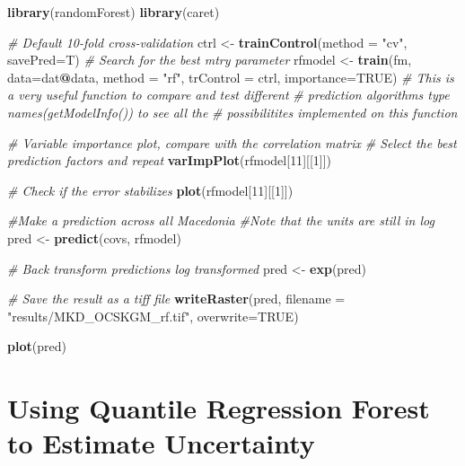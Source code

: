 \documentclass[10pt,b5paper,]{book}
\newenvironment{Shaded}{\begin{snugshade}}{\end{snugshade}}
\newcommand{\CommentTok}[1]{\textcolor[rgb]{0.56,0.35,0.01}{\textit{#1}}}
\newcommand{\DataTypeTok}[1]{\textcolor[rgb]{0.13,0.29,0.53}{#1}}
\newcommand{\DecValTok}[1]{\textcolor[rgb]{0.00,0.00,0.81}{#1}}
\newcommand{\KeywordTok}[1]{\textcolor[rgb]{0.13,0.29,0.53}{\textbf{#1}}}
\newcommand{\NormalTok}[1]{#1}
\newcommand{\OperatorTok}[1]{\textcolor[rgb]{0.81,0.36,0.00}{\textbf{#1}}}
\newcommand{\OtherTok}[1]{\textcolor[rgb]{0.56,0.35,0.01}{#1}}
\newcommand{\StringTok}[1]{\textcolor[rgb]{0.31,0.60,0.02}{#1}}
\theoremstyle{definition}
\theoremstyle{definition}
\theoremstyle{definition}
\theoremstyle{remark}
\begin{document}
\begin{Shaded}
\begin{Highlighting}[]
\KeywordTok{library}\NormalTok{(randomForest)}
\KeywordTok{library}\NormalTok{(caret)}

\CommentTok{# Default 10-fold cross-validation}
\NormalTok{ctrl <-}\StringTok{ }\KeywordTok{trainControl}\NormalTok{(}\DataTypeTok{method =} \StringTok{"cv"}\NormalTok{, }\DataTypeTok{savePred=}\NormalTok{T)}
\CommentTok{# Search for the best mtry parameter}
\NormalTok{rfmodel <-}\StringTok{ }\KeywordTok{train}\NormalTok{(fm, }\DataTypeTok{data=}\NormalTok{dat}\OperatorTok{@}\NormalTok{data, }\DataTypeTok{method =} \StringTok{"rf"}\NormalTok{, }\DataTypeTok{trControl =}\NormalTok{ ctrl,}
                 \DataTypeTok{importance=}\OtherTok{TRUE}\NormalTok{)}
\CommentTok{# This is a very useful function to compare and test different}
\CommentTok{# prediction algorithms type names(getModelInfo()) to see all the}
\CommentTok{# possibilitites implemented on this function}


\CommentTok{# Variable importance plot, compare with the correlation matrix}
\CommentTok{# Select the best prediction factors and repeat}
\KeywordTok{varImpPlot}\NormalTok{(rfmodel[}\DecValTok{11}\NormalTok{][[}\DecValTok{1}\NormalTok{]])}

\CommentTok{# Check if the error stabilizes}
\KeywordTok{plot}\NormalTok{(rfmodel[}\DecValTok{11}\NormalTok{][[}\DecValTok{1}\NormalTok{]])}

\CommentTok{#Make a prediction across all Macedonia}
\CommentTok{#Note that the units are still in log}
\NormalTok{pred <-}\StringTok{ }\KeywordTok{predict}\NormalTok{(covs, rfmodel)}

\CommentTok{# Back transform predictions log transformed}
\NormalTok{pred <-}\StringTok{ }\KeywordTok{exp}\NormalTok{(pred)}

\CommentTok{# Save the result as a tiff file}
\KeywordTok{writeRaster}\NormalTok{(pred, }\DataTypeTok{filename =} \StringTok{"results/MKD_OCSKGM_rf.tif"}\NormalTok{,}
            \DataTypeTok{overwrite=}\OtherTok{TRUE}\NormalTok{)}


\KeywordTok{plot}\NormalTok{(pred)}
\end{Highlighting}
\end{Shaded}

\clearpage

\hypertarget{cd:quantreg}{%
\section{Using Quantile Regression Forest to Estimate
Uncertainty}\label{cd:quantreg}}
\end{document}
